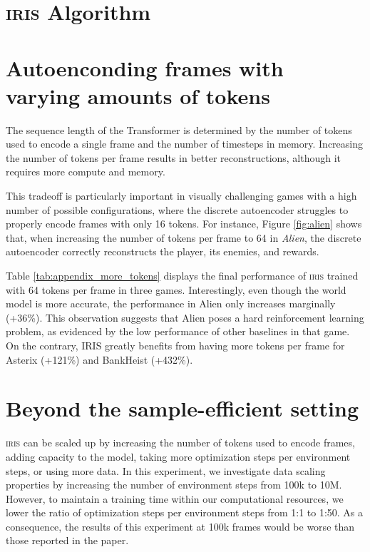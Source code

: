 

\section{\textsc{iris} Algorithm}
\label{appendix:algorithm}



\newpage

\section{Autoenconding frames with varying amounts of tokens}
\label{appendix:ablation_tokens}

The sequence length of the Transformer is determined by the number of tokens used to encode a single frame and the number of timesteps in memory. Increasing the number of tokens per frame results in better reconstructions, although it requires more compute and memory.

This tradeoff is particularly important in visually challenging games with a high number of possible configurations, where the discrete autoencoder struggles to properly encode frames with only 16 tokens. For instance, Figure \ref{fig:alien} shows that, when increasing the number of tokens per frame to 64 in \textit{Alien}, the discrete autoencoder correctly reconstructs the player, its enemies, and rewards.



Table \ref{tab:appendix_more_tokens} displays the final performance of \textsc{iris} trained with 64 tokens per frame in three games. Interestingly, even though the world model is more accurate, the performance in Alien only increases marginally (+36\%). This observation suggests that Alien poses a hard reinforcement learning problem, as evidenced by the low performance of other baselines in that game. On the contrary, IRIS greatly benefits from having more tokens per frame for Asterix (+121\%) and BankHeist (+432\%).




\newpage

\section{Beyond the sample-efficient setting}
\label{appendix:moredata}

\textsc{iris} can be scaled up by increasing the number of tokens used to encode frames, adding capacity to the model, taking more optimization steps per environment steps, or using more data. In this experiment, we investigate data scaling properties by increasing the number of environment steps from 100k to 10M. However, to maintain a training time within our computational resources, we lower the ratio of optimization steps per environment steps from 1:1 to 1:50. As a consequence, the results of this experiment at 100k frames would be worse than those reported in the paper.  

